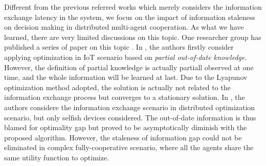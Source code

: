 Different from the previous referred works which merely considers the information exchange latency in the system, we focus on the impact of information staleness on decision making in distributed multi-agent cooperation.
As what we have learned, there are very limited discussions on this topic.
One researcher group has published a series of paper on this topic \cite{JSAC17-LyuX,TWC18-LyuX}.
In \cite{JSAC17-LyuX}, the authors firstly consider applying optimization in IoT scenario based on \emph{partial out-of-date knowledge}.
However, the definition of partial knowledge is actually partiall observed at one time, and the whole information will be learned at last.
Due to the Lyapunov optimization method adopted, the solution is actually not related to the information exchange process but converges to a stationary solution.
In \cite{TWC18-LyuX}, the authors considere the information exchange scenario in distributed optimization scenario, but only selfish devices considered.
The out-of-date information is thus blamed for optimality gap but proved to be asymptotically diminish with the proposed algorithm.
However, the staleness of information gap could not be eliminated in complex fully-cooperative scenario, where all the agents share the same utility function to optimize.

